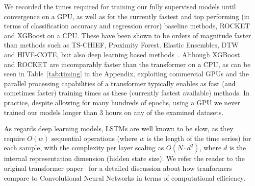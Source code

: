 \documentclass{article} \usepackage{iclr2021_conference,times}
\begin{document}
We recorded the times required for training our fully supervised models until convergence on a GPU, as well as for the currently fastest and top performing (in terms of classification accuracy and regression error) baseline methods, ROCKET and XGBoost on a CPU. These have been shown to be orders of magnitude faster than methods such as TS-CHIEF, Proximity Forest, Elastic Ensembles, DTW and HIVE-COTE, but also deep learning based methods~\cite{rocket_2020}.  Although XGBoost and ROCKET are incomparably faster than the transformer on a CPU, as can be seen in Table~\ref{tab:timing} in the Appendix, exploiting commercial GPUs and the parallel processing capabilities of a transformer typically enables as fast (and sometimes faster) training times as these (currently fastest available) methods. In practice, despite allowing for many hundreds of epochs, using a GPU we never trained our models longer than 3 hours on any of the examined datasets.

As regards deep learning models, LSTMs are well known to be slow, as they require $O(w)$ sequential operations (where $w$ is the length of the time series) for each sample, with the complexity per layer scaling as $O(N\cdot d^2)$, where $d$ is the internal representation dimension (hidden state size). We refer the reader to the original transformer paper~\citep{vaswani_attention_2017} for a detailed discussion about how tranformers compare to Convolutional Neural Networks in terms of computational efficiency.
\end{document}
